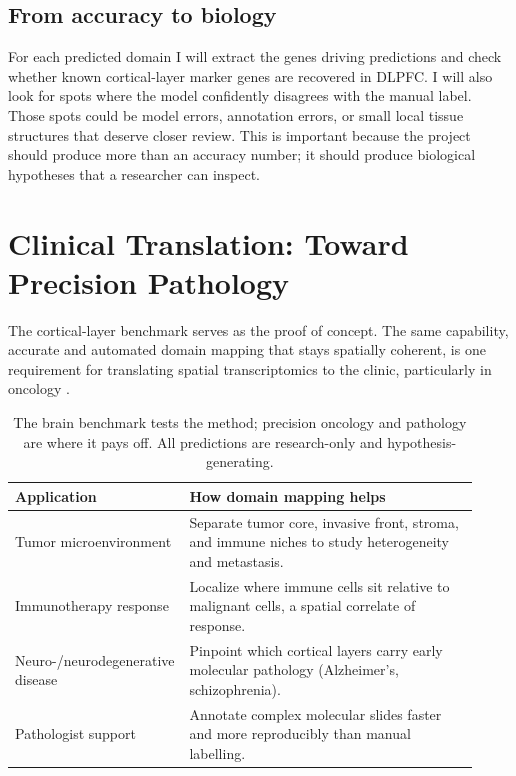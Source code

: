 \documentclass[11pt]{article}
\begin{document}
\subsection{From accuracy to biology}
For each predicted domain I will extract the genes driving predictions and check
whether known cortical-layer marker genes are recovered in DLPFC. I will also
look for spots where the model confidently disagrees with the manual label. Those
spots could be model errors, annotation errors, or small local tissue structures
that deserve closer review. This is important because the project should produce
more than an accuracy number; it should produce biological hypotheses that a
researcher can inspect.

\section{Clinical Translation: Toward Precision Pathology}

The cortical-layer benchmark serves as the proof of concept. The same capability,
accurate and automated domain mapping that stays spatially coherent, is one
requirement for translating spatial transcriptomics to the clinic, particularly
in oncology \cite{cilento2024}.

\begin{table}[H]
\centering\small
\begin{tabular}{>{\raggedright\arraybackslash}p{0.30\linewidth} >{\raggedright\arraybackslash}p{0.62\linewidth}}
\toprule
\rowcolor{sriblue}\color{white}\textbf{Application} & \color{white}\textbf{How domain mapping helps}\\
\midrule
\rowcolor{srirow} Tumor microenvironment & Separate tumor core, invasive front, stroma, and immune niches to study heterogeneity and metastasis.\\
Immunotherapy response & Localize where immune cells sit relative to malignant cells, a spatial correlate of response.\\
\rowcolor{srirow} Neuro-/neurodegenerative disease & Pinpoint which cortical layers carry early molecular pathology (Alzheimer's, schizophrenia).\\
Pathologist support & Annotate complex molecular slides faster and more reproducibly than manual labelling.\\
\bottomrule
\end{tabular}
\caption{The brain benchmark tests the method; precision oncology and pathology
are where it pays off. All predictions are research-only and hypothesis-generating.}
\label{tab:clinical}
\end{table}
\end{document}
